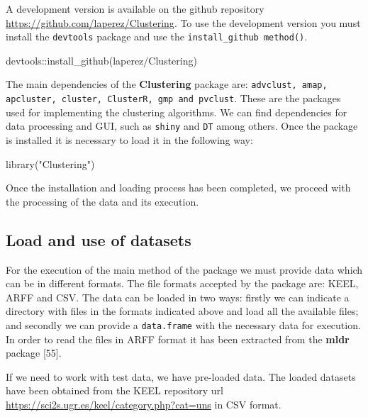 \documentclass[
]{article}
\newenvironment{Shaded}{\begin{snugshade}}{\end{snugshade}}
\newcommand{\FunctionTok}[1]{\textcolor[rgb]{0.00,0.00,0.00}{#1}}
\newcommand{\NormalTok}[1]{#1}
\newcommand{\SpecialCharTok}[1]{\textcolor[rgb]{0.00,0.00,0.00}{#1}}
\newcommand{\StringTok}[1]{\textcolor[rgb]{0.31,0.60,0.02}{#1}}
\begin{document}
A development version is available on the github repository
\url{https://github.com/laperez/Clustering}. To use the development
version you must install the \texttt{devtools} package and use the
\texttt{install\_github method()}.

\begin{Shaded}
\begin{Highlighting}[]
\NormalTok{devtools}\SpecialCharTok{::}\FunctionTok{install\_github}\NormalTok{(}\StringTok{\textquotesingle{}laperez/Clustering\textquotesingle{}}\NormalTok{)}
\end{Highlighting}
\end{Shaded}

The main dependencies of the \textbf{Clustering} package are:
\texttt{advclust, amap, apcluster, cluster, ClusterR, gmp and pvclust}.
These are the packages used for implementing the clustering algorithms.
We can find dependencies for data processing and GUI, such as
\texttt{shiny} and \texttt{DT} among others. Once the package is
installed it is necessary to load it in the following way:

\begin{Shaded}
\begin{Highlighting}[]
\FunctionTok{library}\NormalTok{(}\StringTok{"Clustering"}\NormalTok{)}
\end{Highlighting}
\end{Shaded}

Once the installation and loading process has been completed, we proceed
with the processing of the data and its execution.

\hypertarget{load-and-use-of-datasets}{%
\subsection{Load and use of datasets}\label{load-and-use-of-datasets}}

For the execution of the main method of the package we must provide data
which can be in different formats. The file formats accepted by the
package are: KEEL, ARFF and CSV. The data can be loaded in two ways:
firstly we can indicate a directory with files in the formats indicated
above and load all the available files; and secondly we can provide a
\texttt{data.frame} with the necessary data for execution. In order to
read the files in ARFF format it has been extracted from the
\textbf{mldr} package {[}55{]}.

If we need to work with test data, we have pre-loaded data. The loaded
datasets have been obtained from the KEEL repository url
\url{https://sci2s.ugr.es/keel/category.php?cat=uns} in CSV format.
\end{document}
